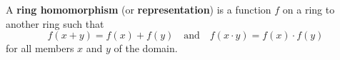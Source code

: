 A \textbf{ring homomorphism} (or \textbf{representation}) is a function $f$ on a ring to another ring such that
$$f(x + y) = f(x) + f(y) \quad \text{and} \quad f(x \cdot y) = f(x) \cdot f(y)$$
for all members $x$ and $y$ of the domain.

